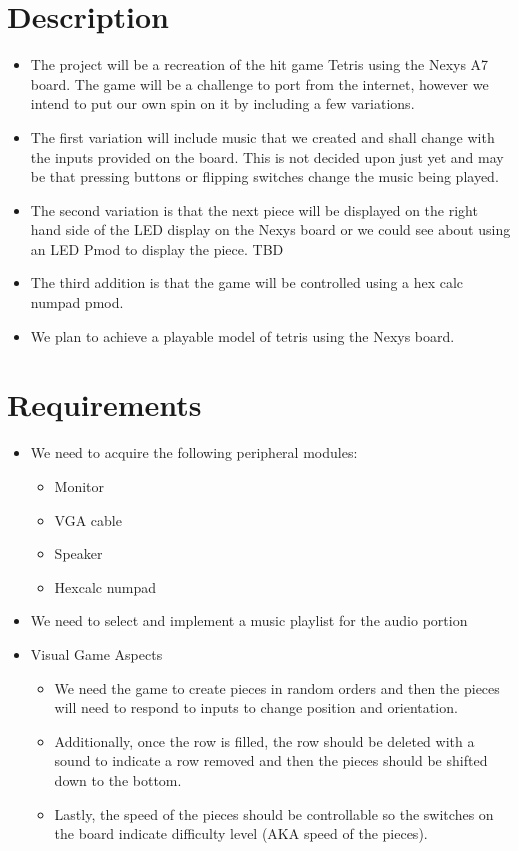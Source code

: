 \section{Description}
    \begin{itemize}
        \item The project will be a recreation of the hit game Tetris using the Nexys A7 board. The game will be a challenge to port from the internet, however we intend to put our own spin on it by including a few variations.
        \item The first variation will include music that we created and shall change with the inputs provided on the board. This is not decided upon just yet and may be that pressing buttons or flipping switches change the music being played.
        \item The second variation is that the next piece will be displayed on the right hand side of the LED display on the Nexys board or we could see about using an LED Pmod to display the piece. TBD
        \item The third addition is that the game will be controlled using a hex calc numpad pmod.
        \item We plan to achieve a playable model of tetris using the Nexys board.
    \end{itemize}
\section{Requirements}
    \begin{itemize}
        \item We need to acquire the following peripheral modules:
            \begin{itemize}
                \item Monitor
                \item VGA cable
                \item Speaker
                \item Hexcalc numpad
            \end{itemize}
        \item We need to select and implement a music playlist for the audio portion
        \item Visual Game Aspects
        \begin{itemize}
            \item We need the game to create pieces in random orders and then the pieces will need to respond to inputs to change position and orientation. 
            \item Additionally, once the row is filled, the row should be deleted with a sound to indicate a row removed and then the pieces should be shifted down to the bottom.
            \item Lastly, the speed of the pieces should be controllable so the switches on the board indicate difficulty level (AKA speed of the pieces).
        \end{itemize}
    \end{itemize}
